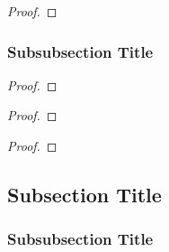 \begin{coro}
    \lipsum[1]
\end{coro}

\begin{proof}
    \lipsum[1]
\end{proof}

\subsubsection{Subsubsection Title}

\begin{lemm}
    \lipsum[1]
\end{lemm}

\begin{proof}
    \lipsum[1]
\end{proof}

\begin{thrm}
    \lipsum[1]
\end{thrm}

\begin{proof}
    \lipsum[1]
\end{proof}

\begin{coro}
    \lipsum[1]
\end{coro}

\begin{proof}
    \lipsum[1]
\end{proof}

\subsection{Subsection Title}


\begin{defn}
    \lipsum[1]
\end{defn}

\begin{exmp}
    \lipsum[1]
\end{exmp}

\begin{rmrk}
    \lipsum[1]
\end{rmrk}

\subsubsection{Subsubsection Title}

\begin{lemm}
    \lipsum[1]
\end{lemm}

